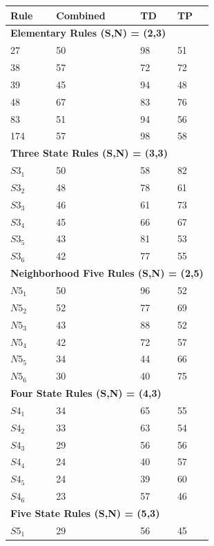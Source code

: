 \documentclass{elsarticle}
\begin{document}
\begin{multicols}{2}
\begin{table}[H] \centering
\begin{tabular}{|l|l|l|l|}
\hline
\textbf{Rule} & \textbf{Combined} & \textbf{TD} & \textbf{TP} \\ \hline
\multicolumn{4}{|l|}{\textbf{Elementary Rules (S,N) = (2,3)}} \\ \hline
27 & 50 & 98 & 51 \\ \hline
38 & 57 & 72 & 72 \\ \hline
39 & 45 & 94 & 48 \\ \hline
48 & 67 & 83 & 76 \\ \hline
83 & 51 & 94 & 56 \\ \hline
174 & 57 & 98 & 58 \\ \hline
   \multicolumn{4}{|l|}{\textbf{Three State Rules (S,N) = (3,3)}} \\ \hline
$S3_{1}$ & 50 & 58 & 82 \\ \hline
$S3_{2}$ & 48 & 78 & 61 \\ \hline
$S3_{3}$ & 46 & 61 & 73 \\ \hline
$S3_{4}$ & 45 & 66 & 67 \\ \hline
$S3_{5}$ & 43 & 81 & 53 \\ \hline
$S3_{6}$ & 42 & 77 & 55 \\ \hline
\multicolumn{4}{|l|}{\textbf{Neighborhood Five Rules (S,N) = (2,5)}} \\ \hline
$N5_{1}$ & 50 & 96 & 52 \\ \hline
$N5_{2}$ & 52 & 77 & 69 \\ \hline
$N5_{3}$ & 43 & 88 & 52 \\ \hline
$N5_{4}$ & 42 & 72 & 57 \\ \hline
$N5_{5}$ & 34 & 44 & 66 \\  \hline
$N5_{6}$ & 30 & 40 & 75 \\ \hline
\multicolumn{4}{|l|}{\textbf{Four State Rules (S,N) = (4,3)}} \\ \hline
$S4_{1}$ & 34 & 65 & 55 \\ \hline
$S4_{2}$ & 33 & 63 & 54 \\ \hline
$S4_{3}$ & 29 & 56 & 56 \\ \hline
$S4_{4}$ & 24 & 40 & 57 \\ \hline
$S4_{5}$ & 24 & 39 & 60 \\ \hline
$S4_{6}$ & 23 & 57 & 46 \\ \hline
\multicolumn{4}{|l|}{\textbf{Five State Rules (S,N) = (5,3)}} \\ \hline
$S5_{1}$ & 29 & 56 & 45 \\ \hline

\end{tabular}
\end{table}
\end{multicols}
\end{document}
